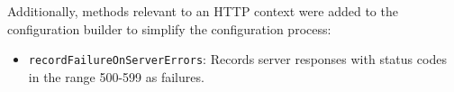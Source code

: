 Additionally, methods relevant to an HTTP context were added to the configuration builder to simplify the configuration process:

\begin{itemize}
    \item \texttt{recordFailureOnServerErrors}: Records server responses with status codes in the range 500-599 as failures.
\end{itemize}
